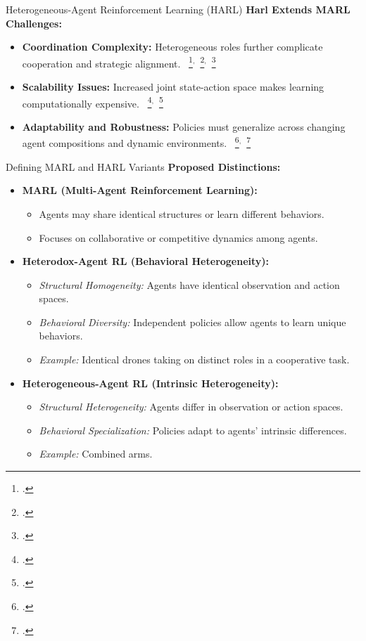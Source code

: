 \documentclass[xcolor={svgnames}]{beamer}
\begin{document}

\begin{frame}{Heterogeneous-Agent Reinforcement Learning (HARL)}
    \textbf{Harl Extends MARL Challenges:}
    \begin{itemize}
        \item \textbf{Coordination Complexity:} Heterogeneous roles further complicate 
            cooperation and strategic alignment.
            ~\footcite{wakilpoor2020}$^,$~\footcite{yang2020a}$^,$~\footcite{gronauer2022}
        \item \textbf{Scalability Issues:} Increased joint state-action space makes 
            learning computationally expensive.
            ~\footcite{leibo2021}$^,$~\footcite{rizk2019}
        \item \textbf{Adaptability and Robustness:} Policies must generalize across 
            changing agent compositions and dynamic environments.
            ~\footcite{yang2021a}$^,$~\footcite{koster2020}
    \end{itemize}
\end{frame}


\begin{frame}{Defining MARL and HARL Variants}
    \textbf{Proposed Distinctions:}
    \begin{itemize}
        \item \textbf{MARL (Multi-Agent Reinforcement Learning):}
        \begin{itemize}
            \item Agents may share identical structures or learn different behaviors.
            \item Focuses on collaborative or competitive dynamics among agents.
        \end{itemize}
        \item \textbf{Heterodox-Agent RL (Behavioral Heterogeneity):}
        \begin{itemize}
            \item \emph{Structural Homogeneity:} Agents have identical observation and action spaces.
            \item \emph{Behavioral Diversity:} Independent policies allow agents to learn unique behaviors.
            \item \textit{Example:} Identical drones taking on distinct roles in a cooperative task.
        \end{itemize}
        \item \textbf{Heterogeneous-Agent RL (Intrinsic Heterogeneity):}
        \begin{itemize}
            \item \emph{Structural Heterogeneity:} Agents differ in observation or action spaces.
            \item \emph{Behavioral Specialization:} Policies adapt to agents' intrinsic differences.
            \item \textit{Example:} Combined arms.
        \end{itemize}
    \end{itemize}
\end{frame}
\end{document}
